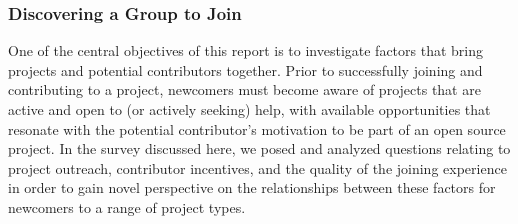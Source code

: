 \subsubsection {Discovering a Group to Join}

One of the central objectives of this report is to investigate factors that bring projects and potential contributors together. Prior to successfully joining and contributing to a project, newcomers must become aware of projects that are active and open to (or actively seeking) help, with available opportunities that resonate with the potential contributor's motivation to be part of an open source project. In the survey discussed here, we posed and analyzed questions relating to project outreach, contributor incentives, and the quality of the joining experience in order to gain novel perspective on the relationships between these factors for newcomers to a range of project types.